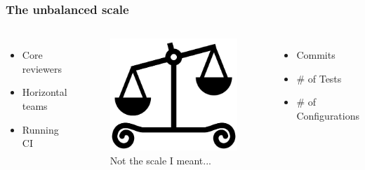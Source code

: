\documentclass[aspectratio=169,11pt,hyperref={colorlinks=true}]{beamer}
\begin{document}
\begin{frame}
    \frametitle{The unbalanced scale}
    \begin{columns}
             \begin{itemize}
                 \item{Core reviewers}
                 \item{Horizontal teams}
                 \item{Running CI}
             \end{itemize}
            \begin{figure}
                \includegraphics[width=1\textwidth]{unbalanced_scale.png}
                \caption{Not the scale I meant...}
            \end{figure}
             \begin{itemize}
                 \item{Commits}
                 \item{\# of Tests}
                 \item{\# of Configurations}
             \end{itemize}
    \end{columns}
\end{frame}

\end{document}
